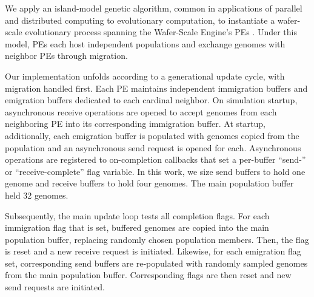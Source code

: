 

% 

We apply an island-model genetic algorithm, common in applications of parallel and distributed computing to evolutionary computation, to instantiate a wafer-scale evolutionary process spanning the Wafer-Scale Engine's PEs \citep{bennett1999building}.
Under this model, PEs each host independent populations and exchange genomes with neighbor PEs through migration.

Our implementation unfolds according to a generational update cycle, with migration handled first.
Each PE maintains independent immigration buffers and emigration buffers dedicated to each cardinal neighbor.
On simulation startup, asynchronous receive operations are opened to accept genomes from each neighboring PE into its corresponding immigration buffer.
At startup, additionally, each emigration buffer is populated with genomes copied from the population and an asynchronous send request is opened for each. %
Asynchronous operations are registered to on-completion callbacks that set a per-buffer ``send-'' or ``receive-complete'' flag variable.
In this work, we size send buffers to hold one genome and receive buffers to hold four genomes.
The main population buffer held 32 genomes.

Subsequently, the main update loop tests all completion flags.
For each immigration flag that is set, buffered genomes are copied into the main population buffer, replacing randomly chosen population members.
Then, the flag is reset and a new receive request is initiated.
Likewise, for each emigration flag set, corresponding send buffers are re-populated with randomly sampled genomes from the main population buffer.
Corresponding flags are then reset and new send requests are initiated.

